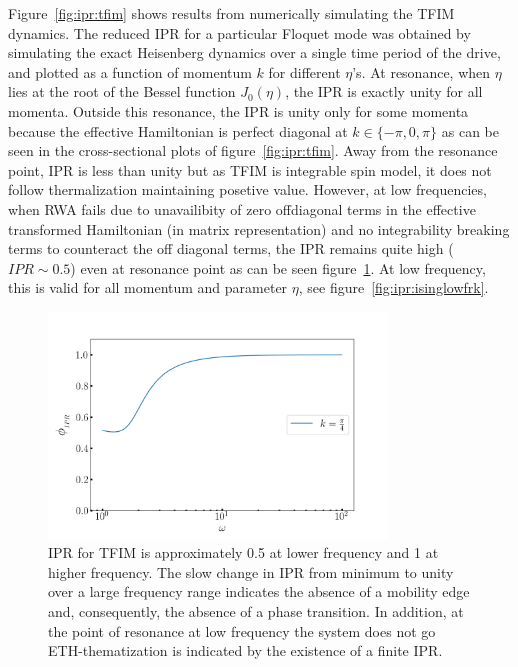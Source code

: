 \documentclass[%
reprint,
superscriptaddress,
amsmath,amssymb,
aps,
prb,
]{revtex4-2}
\begin{document}
	Figure~\ref{fig:ipr:tfim} shows results from numerically simulating the TFIM dynamics. The reduced IPR for a particular Floquet mode was obtained by simulating the exact Heisenberg dynamics over a single time period of the drive, and plotted as a function of momentum $k$ for different $\eta$'s. At resonance, when $\eta$ lies at the root of the Bessel function $J_0(\eta)$,  the IPR is exactly unity for all momenta. Outside this resonance, the IPR is unity only for some momenta because the effective Hamiltonian is perfect diagonal at $k \in{\{-\pi, 0, \pi\}}$ as can be seen in the cross-sectional plots of figure~\ref{fig:ipr:tfim}. Away from the resonance point, IPR is less than unity but as TFIM is integrable spin model, it does not follow thermalization maintaining posetive value. However, at low frequencies, when RWA fails due to unavailibity of zero offdiagonal terms in the  effective transformed Hamiltonian (in matrix representation) and no integrability breaking terms to counteract the off diagonal terms, the IPR remains quite high ($IPR \sim 0.5$) even at resonance point as can be seen figure~\ref{fig:ipr:isinglowfr}. At low frequency, this is valid for all momentum and parameter $\eta$, see figure~\ref{fig:ipr:isinglowfrk}.
	
	
	
	\begin{figure}[hbt!]
		\centering
		\includegraphics[height = 6cm, width = 9.0cm]{phase_transition_ising.jpeg}
		\caption{IPR for TFIM is approximately 0.5 at lower frequency and 1 at higher frequency. The slow change in IPR from minimum to unity over a large frequency range indicates the absence of a mobility edge and, consequently, the absence of a phase transition. In addition, at the point of resonance at low frequency the system does not go ETH-thematization is indicated by the existence of a finite IPR.}
		\label{fig:ipr:isinglowfr}
	\end{figure}
	
\end{document}
